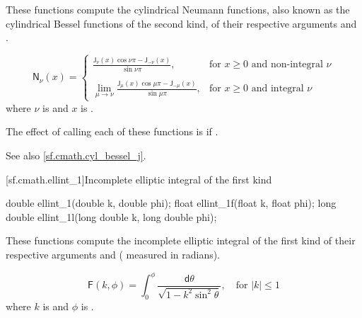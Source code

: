 \begin{itemdescr}

\pnum\effects
These functions compute the cylindrical Neumann functions,
also known as the cylindrical Bessel functions of the second kind,
of their respective arguments
 and .

\pnum\returns
\[%
  \mathsf{N}_\nu(x) =
  \left\{
  \begin{array}{cl}
  \displaystyle
  \frac{\mathsf{J}_\nu(x) \cos \nu\pi - \mathsf{J}_{-\nu}(x)}
       {\sin \nu\pi },
  & \mbox{for $x \ge 0$ and non-integral $\nu$}
  \\
  \\
  \displaystyle
  \lim_{\mu \rightarrow \nu} \frac{\mathsf{J}_\mu(x) \cos \mu\pi - \mathsf{J}_{-\mu}(x)}
                                {\sin \mu\pi },
  & \mbox{for $x \ge 0$ and integral $\nu$}
  \end{array}
  \right.
\]
where
$\nu$ is  and
$x$ is .

\pnum\remarks
The effect of calling each of these functions
is 
if .

\pnum See also \ref{sf.cmath.cyl_bessel_j}.
\end{itemdescr}

[sf.cmath.ellint_1]{Incomplete elliptic integral of the first kind}%
%
%
%
%
%
\begin{itemdecl}
double       ellint_1(double k, double phi);
float        ellint_1f(float k, float phi);
long double  ellint_1l(long double k, long double phi);
\end{itemdecl}

\begin{itemdescr}

\pnum\effects
These functions compute
the incomplete elliptic integral of the first kind
of their respective arguments
 and  ( measured in radians).

\pnum\returns
\[%
  \mathsf{F}(k, \phi) =
  \int_0^\phi \! \frac{\mathsf{d}\theta}
                      {\sqrt{1 - k^2 \sin^2 \theta}},
	   \quad \mbox{for $|k| \le 1$}
\]
where
$k$ is  and
$\phi$ is .
\end{itemdescr}

